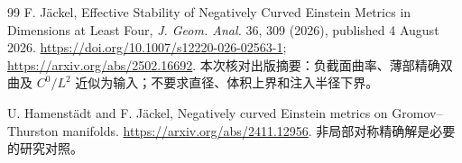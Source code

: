 \documentclass[UTF8,fontset=fandol,zihao=-4]{ctexart}
\theoremstyle{research}
\begin{document}
\begin{thebibliography}{99}
 F. Jäckel, Effective Stability of Negatively Curved Einstein Metrics in Dimensions at Least Four, \emph{J. Geom. Anal.} 36, 309 (2026), published 4 August 2026. \url{https://doi.org/10.1007/s12220-026-02563-1}; \url{https://arxiv.org/abs/2502.16692}. 本次核对出版摘要：负截面曲率、薄部精确双曲及 $C^0/L^2$ 近似为输入；不要求直径、体积上界和注入半径下界。

 U. Hamenstädt and F. Jäckel, Negatively curved Einstein metrics on Gromov--Thurston manifolds. \url{https://arxiv.org/abs/2411.12956}. 非局部对称精确解是必要的研究对照。

\end{thebibliography}
\end{document}
